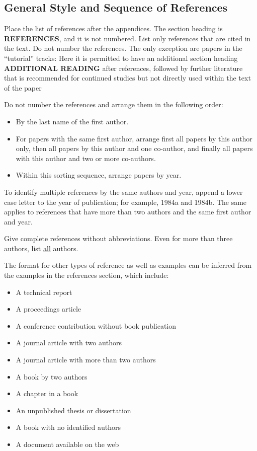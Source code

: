 \documentclass{article}
\begin{document}
\subsection{General Style and Sequence of References}
Place the list of references after the appendices. The section heading is {\bf REFERENCES}, and it is not numbered. List only references that are cited in the text. Do not number the references. The only exception are papers in the ``tutorial'' tracks: Here it is permitted to have an additional section heading {\bf ADDITIONAL READING} after references, followed by further literature that is recommended for continued studies but not directly used within the text of the paper

Do not number the references and arrange them in the following order:
\begin{itemize}
	\item By the last name of the first author.
	\item For papers with the same first author, arrange first all papers by this author only, then all papers by this author and one co-author, and finally all papers with this author and two or more co-authors.
\item Within this sorting sequence, arrange papers by year.
\end{itemize}

To identify multiple references by the same authors and year, append a lower case letter to the year of publication; for example, 1984a and 1984b. The same applies to references that have more than two authors and the same first author and year. 

Give complete references without abbreviations. Even for more than three authors, list \underline{all} authors. 

The format for other types of reference as well as examples can be inferred from the examples in the references section, which include:
\begin{itemize}
\item A technical report \cite{chi89}
\item A proceedings article \cite{cheng:input94}
\item A conference contribution without book publication 
\item A journal article with two authors \cite{powell2017widening}
\item A journal article with more than two authors 
\item A book by two authors \cite{hammersley:montecarlo}
\item A chapter in a book \cite{sch79}
\item An unpublished thesis or dissertation \cite{ste99}
\item A book with no identified authors \cite{chicago03}
\item A document available on the web \cite{WSC}
\end{itemize}
\end{document}
